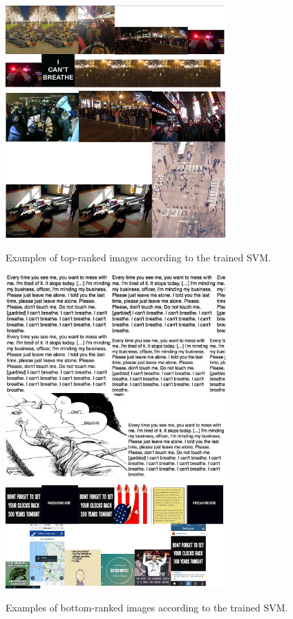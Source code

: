 \documentclass[twoside,11pt]{article}
\begin{document}
\begin{figure}[b]
\centering
\includegraphics[width=0.75\textwidth]{top_ranked2.png}
\includegraphics[width=0.75\textwidth]{top_ranked3.png}
\caption{Examples of top-ranked images according to the trained SVM.}
\label{fig:top}
\end{figure}

\begin{figure}[b]
\centering
\includegraphics[width=0.75\textwidth]{bottom_ranked.png}
\includegraphics[width=0.75\textwidth]{bottom_ranked3.png}
\caption{Examples of bottom-ranked images according to the trained SVM.}
\label{fig:bottom}
\end{figure}
\end{document}
